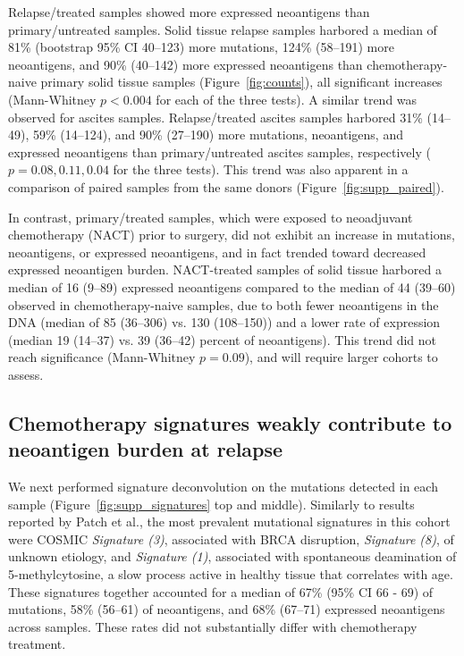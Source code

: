 Relapse/treated samples showed more expressed neoantigens than primary/untreated samples. Solid tissue relapse samples harbored a median of 81\% (bootstrap 95\% CI 40--123) more mutations, 124\% (58--191) more neoantigens, and 90\% (40--142) more expressed neoantigens than chemotherapy-naive primary solid tissue samples (Figure~\ref{fig:counts}), all significant increases (Mann-Whitney $p < 0.004$ for each of the three tests). A similar trend was observed for ascites samples. Relapse/treated ascites samples harbored 31\% (14--49), 59\% (14--124), and 90\% (27--190) more mutations, neoantigens, and expressed neoantigens than primary/untreated ascites samples, respectively ($p=0.08, 0.11, 0.04$ for the three tests). This trend was also apparent in a comparison of paired samples from the same donors (Figure~\ref{fig:supp_paired}). 

In contrast, primary/treated samples, which were exposed to neoadjuvant chemotherapy (NACT) prior to surgery, did not exhibit an increase in mutations, neoantigens, or expressed neoantigens, and in fact trended toward decreased expressed neoantigen burden. NACT-treated samples of solid tissue harbored a median of 16 (9--89) expressed neoantigens compared to the median of 44 (39--60) observed in chemotherapy-naive samples, due to both fewer neoantigens in the DNA (median of 85 (36--306) vs. 130 (108--150)) and a lower rate of expression (median 19 (14--37) vs. 39 (36--42) percent of neoantigens). This trend did not reach significance (Mann-Whitney $p=0.09$), and will require larger cohorts to assess.

\subsection*{Chemotherapy signatures weakly contribute to neoantigen burden at relapse}

We next performed signature deconvolution on the mutations detected in each sample (Figure~\ref{fig:supp_signatures} top and middle). Similarly to results reported by Patch et al., the most prevalent mutational signatures in this cohort were COSMIC \textit{Signature (3)}, associated with BRCA disruption, \textit{Signature (8)}, of unknown etiology, and \textit{Signature (1)}, associated with spontaneous deamination of 5-methylcytosine, a slow process active in healthy tissue that correlates with age. These signatures together accounted for a median of 67\% (95\% CI 66 - 69) of mutations, 58\% (56--61) of neoantigens, and 68\% (67--71) expressed neoantigens across samples. These rates did not substantially differ with chemotherapy treatment.

